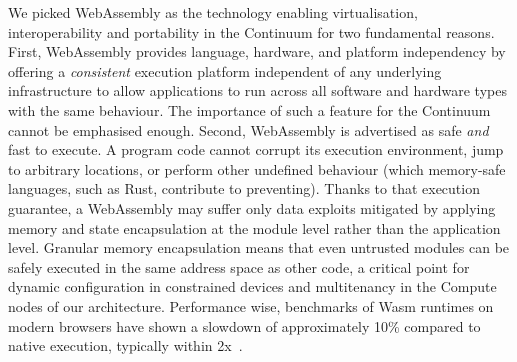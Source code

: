 We picked WebAssembly as the technology enabling virtualisation, interoperability and portability in the Continuum for two fundamental reasons. 
First, WebAssembly provides language, hardware, and platform independency by offering a \textit{consistent} execution platform independent of any underlying infrastructure to allow applications to run across all software and hardware types with the same behaviour. The importance of such a feature for the Continuum cannot be emphasised enough.
Second, WebAssembly is advertised as safe \textit{and} fast to execute. A program code cannot corrupt its execution environment, jump to arbitrary locations, or perform other undefined behaviour (which memory-safe languages, such as Rust, contribute to preventing). Thanks to that execution guarantee, a WebAssembly may suffer only data exploits mitigated by applying memory and state encapsulation at the module level rather than the application level.
Granular memory encapsulation means that even untrusted modules can be safely executed in the same address space as other code, a critical point for dynamic configuration in constrained devices and multitenancy in the Compute nodes of our architecture. Performance wise, benchmarks of Wasm runtimes on modern browsers have shown a slowdown of approximately 10\% compared to native execution, typically within 2x~\cite{haas2017bringing, menetrey2022webassembly}.

